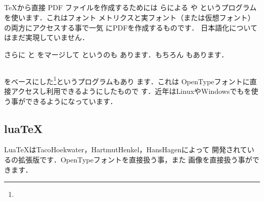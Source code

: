 \subsection{\PDFTeX}

\TeX から直接 PDF ファイルを作成するためには
らによる \Prog[PDFTeX]{\PDFTeX} や
\Prog[PDFlatex]{\PDFLaTeX} というプログラムを使います．これはフォント
メトリクスと実フォント（または仮想フォント）の両方にアクセスする事で一気
にPDFを作成するものです．%
日本語化についてはまだ実現していません．

%
さらに \eTeX と \PDFTeX をマージして \Prog[PDFeTeX]{\PDFeTeX} というのも
あります．もちろん \Prog[PDFeLaTeX]{\PDFeLaTeX} もあります．

\subsection{\XeTeX}
\PDFeTeX をベースにした\XeTeX\footnote{\webXeTeX}というプログラムもあり
ます．これは OpenTypeフォントに直接アクセスし利用できるようにしたもので
す．近年はLinuxやWindowsでも\XeTeX を使う事ができるようになっています．

\subsection{lua\TeX}
Lua\TeX は{Taco}{Hoekwater}，{Hartmut}{Henkel}，{Hans}{Hagen}によって
開発されている\PDFTeX の拡張版です．OpenTypeフォントを直接扱う事，また
\MP 画像を直接扱う事ができます．



